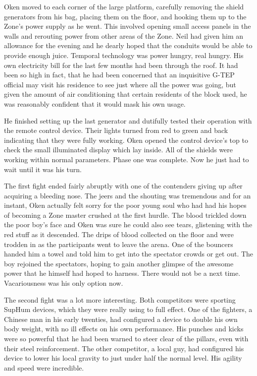 Oken moved to each corner of the large platform, carefully removing the shield generators from his bag, placing them on the floor, and hooking them up to the Zone's power supply as he went. This involved opening small access panels in the walls and rerouting power from other areas of the Zone. Neil had given him an allowance for the evening and he dearly hoped that the conduits would be able to provide enough juice. Temporal technology was power hungry, real hungry. His own electricity bill for the last few months had been through the roof. It had been so high in fact, that he had been concerned that an inquisitive G-TEP official may visit his residence to see just where all the power was going, but given the amount of air conditioning that certain residents of the block used, he was reasonably confident that it would mask his own usage.

He finished setting up the last generator and dutifully tested their operation with the remote control device. Their lights turned from red to green and back indicating that they were fully working. Oken opened the control device's top to check the small illuminated display which lay inside. All of the shields were working within normal parameters. Phase one was complete. Now he just had to wait until it was his turn.

The first fight ended fairly abruptly with one of the contenders giving up after acquiring a bleeding nose. The jeers and the shouting was tremendous and for an instant, Oken actually felt sorry for the poor young soul who had had his hopes of becoming a Zone master crushed at the first hurdle. The blood trickled down the poor boy's face and Oken was sure he could also see tears, glistening with the red stuff as it descended. The drips of blood collected on the floor and were trodden in as the participants went to leave the arena. One of the bouncers handed him a towel and told him to get into the spectator crowds or get out. The boy rejoined the spectators, hoping to gain another glimpse of the awesome power that he himself had hoped to harness. There would not be a next time. Vacariousness was his only option now.

The second fight was a lot more interesting. Both competitors were sporting SupHum devices, which they were really using to full effect. One of the fighters, a Chinese man in his early twenties, had configured a device to double his own body weight, with no ill effects on his own performance. His punches and kicks were so powerful that he had been warned to steer clear of the pillars, even with their steel reinforcement. The other competitor, a local guy, had configured his device to lower his local gravity to just under half the normal level. His agility and speed were incredible.


